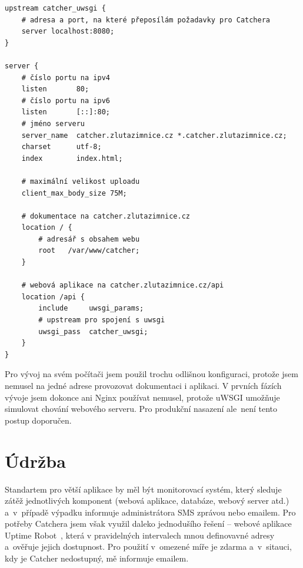 \begingroup
\fontsize{9.5pt}{11pt}\selectfont
\begin{verbatim}
upstream catcher_uwsgi {
    # adresa a port, na které přeposílám požadavky pro Catchera
    server localhost:8080;
}

server {
    # číslo portu na ipv4
    listen       80;
    # číslo portu na ipv6
    listen       [::]:80;
    # jméno serveru
    server_name  catcher.zlutazimnice.cz *.catcher.zlutazimnice.cz;
    charset      utf-8;
    index        index.html;
    
    # maximální velikost uploadu
    client_max_body_size 75M;

    # dokumentace na catcher.zlutazimnice.cz
    location / {
        # adresář s obsahem webu
        root   /var/www/catcher;
    }

    # webová aplikace na catcher.zlutazimnice.cz/api
    location /api {
        include     uwsgi_params;
        # upstream pro spojení s uwsgi
        uwsgi_pass  catcher_uwsgi;
    }
}
\end{verbatim}
\endgroup

Pro vývoj na svém počítači jsem použil trochu odlišnou konfiguraci, protože
jsem nemusel na jedné adrese provozovat dokumentaci i aplikaci.
V prvních fázích vývoje jsem dokonce ani Nginx používat nemusel, protože uWSGI umožňuje simulovat
chování webového serveru.
Pro produkční nasazení ale~není tento postup doporučen.

\section{Údržba}

Standartem pro větší aplikace by měl být monitorovací systém,
který sleduje zátěž jednotlivých komponent (webová aplikace, databáze, webový server atd.)
a~v~případě výpadku informuje administrátora SMS zprávou nebo emailem.
Pro potřeby Catchera jsem však využil daleko jednodušího řešení -- webové aplikace Uptime Robot~\cite{uptime_robot},
která v pravidelných intervalech  mnou definovavné adresy a~ověřuje jejich dostupnost.
Pro použití v~omezené míře je zdarma a~v~sitauci, kdy je Catcher nedostupný, mě informuje emailem.







